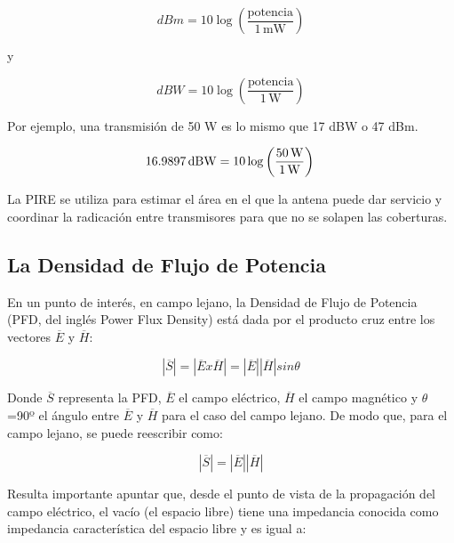 \begin{equation} \label{equ_dbm}
dBm=10\log \left({\frac {\text{potencia}}{1\,\mathrm {mW} }}\right) 				
\end{equation}

y

\begin{equation} \label{equ_dbw}
dBW=10\log \left({\frac {\text{potencia}}{1\,\mathrm {W} }}\right) 				
\end{equation}



Por ejemplo, una transmisión de 50 W es lo mismo que 17 dBW o 47 dBm.

\begin{equation} \label{equ_dbwdos}
\displaystyle 16.9897\,\mathrm {dBW} =10\log \left({\frac {50\,\mathrm {W} }{1\,\mathrm {W} }}\right) \\
\end{equation}

La PIRE se utiliza para estimar el área en el que la antena puede dar servicio y coordinar la radicación entre transmisores para que no se solapen las coberturas.

\subsection{La Densidad de Flujo de Potencia}

En un punto de interés, en campo lejano, la Densidad de Flujo de Potencia (PFD, del inglés Power Flux Density) está dada por el producto cruz entre los vectores $\overline{E}$ y $\overline{H}$:

\begin{equation} \label{equ_cuarenta_uno}
	 |\overline{S}|=|\overline{E} x \overline{H}|=|\overline{E} | |\overline{H}| sin \theta
\end{equation}

Donde $\overline{S}$ representa la PFD, $\overline{E}$  el campo eléctrico, $\overline{H}$ el campo magnético y $\theta$=90º el ángulo entre $\overline{E}$ y $\overline{H}$ para el caso del campo lejano. De modo que, para el campo lejano,  se puede reescribir  como: 

\begin{equation} \label{equ_cuarenta_dos}
	|\overline{S}|=|\overline{E} | |\overline{H}|
\end{equation}


Resulta importante apuntar que, desde el punto de vista de la propagación del campo eléctrico, el vacío (el espacio libre) tiene una impedancia conocida como impedancia característica del espacio libre y es igual a: 

